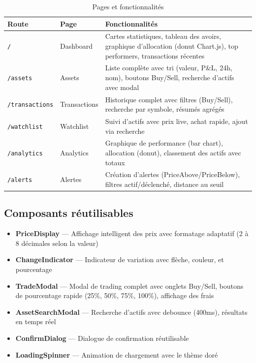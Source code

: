 \documentclass[12pt,a4paper]{article}
\begin{document}
\begin{table}[H]
\centering
\caption{Pages et fonctionnalités}
\begin{tabularx}{\textwidth}{llX}
    \toprule
    \textbf{Route} & \textbf{Page} & \textbf{Fonctionnalités} \\
    \midrule
    \texttt{/} & Dashboard & Cartes statistiques, tableau des avoirs, graphique d'allocation (donut Chart.js), top performers, transactions récentes \\
    \texttt{/assets} & Assets & Liste complète avec tri (valeur, P\&L, 24h, nom), boutons Buy/Sell, recherche d'actifs avec modal \\
    \texttt{/transactions} & Transactions & Historique complet avec filtres (Buy/Sell), recherche par symbole, résumés agrégés \\
    \texttt{/watchlist} & Watchlist & Suivi d'actifs avec prix live, achat rapide, ajout via recherche \\
    \texttt{/analytics} & Analytics & Graphique de performance (bar chart), allocation (donut), classement des actifs avec totaux \\
    \texttt{/alerts} & Alertes & Création d'alertes (PriceAbove/PriceBelow), filtres actif/déclenché, distance au seuil \\
    \bottomrule
\end{tabularx}
\end{table}

\subsection{Composants réutilisables}

\begin{itemize}
    \item \textbf{PriceDisplay} --- Affichage intelligent des prix avec formatage adaptatif (2 à 8 décimales selon la valeur)
    \item \textbf{ChangeIndicator} --- Indicateur de variation avec flèche, couleur, et pourcentage
    \item \textbf{TradeModal} --- Modal de trading complet avec onglets Buy/Sell, boutons de pourcentage rapide (25\%, 50\%, 75\%, 100\%), affichage des frais
    \item \textbf{AssetSearchModal} --- Recherche d'actifs avec debounce (400ms), résultats en temps réel
    \item \textbf{ConfirmDialog} --- Dialogue de confirmation réutilisable
    \item \textbf{LoadingSpinner} --- Animation de chargement avec le thème doré
\end{itemize}
\end{document}
